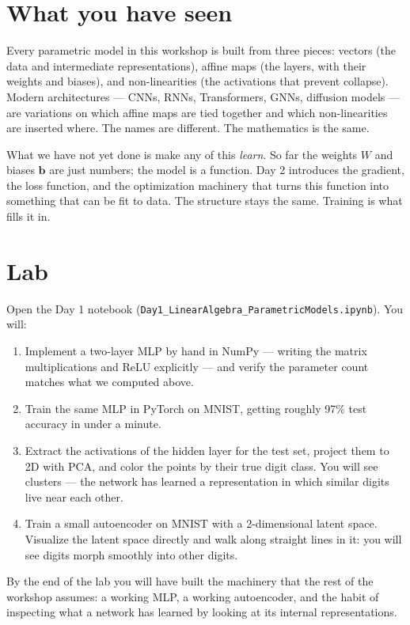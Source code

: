 \section{What you have seen}

Every parametric model in this workshop is built from three pieces: vectors (the data and intermediate representations), affine maps (the layers, with their weights and biases), and non-linearities (the activations that prevent collapse). Modern architectures --- CNNs, RNNs, Transformers, GNNs, diffusion models --- are variations on which affine maps are tied together and which non-linearities are inserted where. The names are different. The mathematics is the same.

What we have not yet done is make any of this \emph{learn}. So far the weights $W$ and biases $\bm{b}$ are just numbers; the model is a function. Day 2 introduces the gradient, the loss function, and the optimization machinery that turns this function into something that can be fit to data. The structure stays the same. Training is what fills it in.

\section*{Lab}

Open the Day 1 notebook (\texttt{Day1\_LinearAlgebra\_ParametricModels.ipynb}). You will:

\begin{enumerate}
  \item Implement a two-layer MLP by hand in NumPy --- writing the matrix multiplications and ReLU explicitly --- and verify the parameter count matches what we computed above.
  \item Train the same MLP in PyTorch on MNIST, getting roughly 97\% test accuracy in under a minute.
  \item Extract the activations of the hidden layer for the test set, project them to 2D with PCA, and color the points by their true digit class. You will see clusters --- the network has learned a representation in which similar digits live near each other.
  \item Train a small autoencoder on MNIST with a 2-dimensional latent space. Visualize the latent space directly and walk along straight lines in it: you will see digits morph smoothly into other digits.
\end{enumerate}

By the end of the lab you will have built the machinery that the rest of the workshop assumes: a working MLP, a working autoencoder, and the habit of inspecting what a network has learned by looking at its internal representations.
